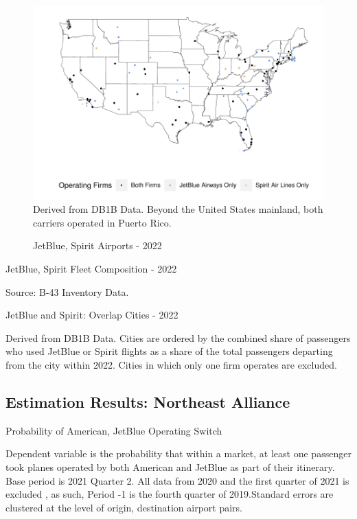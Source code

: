 \documentclass{article}
\begin{document}
\begin{appendices}
\begin{figure}
	\caption{JetBlue, Spirit Airports - 2022}
	\label{fig:JBSpirit_Airports_2022}
	\includegraphics[width = \linewidth]{Map_Mainland_Both_2022.pdf}
	\footnotesize{Derived from DB1B Data. Beyond the United States mainland, both carriers operated in Puerto Rico.}
\end{figure}

\begin{table}
	\begin{center}
		\caption{JetBlue, Spirit Fleet Composition - 2022}
		\label{tab:JetBlueSpirit_Fleet}
		
	\end{center}
	\footnotesize{Source: B-43 Inventory Data. }
\end{table}

	\begin{table}
		\caption{JetBlue and Spirit: Overlap Cities - 2022}
		\label{tab:KeyCities}
		
		\footnotesize{Derived from DB1B Data. Cities are ordered by the combined share of passengers who used JetBlue or Spirit flights as a share of the total passengers departing from the city within 2022. Cities in which only one firm operates are excluded.}
	\end{table}

	
	\FloatBarrier
	
	\subsection{Estimation Results: Northeast Alliance}

	\begin{table}
	\caption{Probability of American, JetBlue Operating Switch}
	\label{tab:NEA_Switch_Prob}
	
	\footnotesize{Dependent variable is the probability that within a market, at least one passenger took planes operated by both American and JetBlue as part of their itinerary. Base period is 2021 Quarter 2. All data from 2020 and the first quarter of 2021 is excluded , as such,  Period -1 is the fourth quarter of 2019.Standard errors are clustered at the level of origin, destination airport pairs.}
\end{table}
	

\end{appendices}
\end{document}
